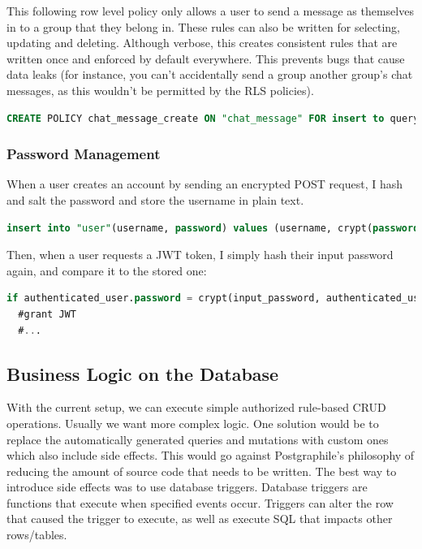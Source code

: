 \documentclass{l4proj}
\begin{document}
This following row level policy only allows a user to send a message as themselves in to a group that they belong in. These rules can also be written for selecting, updating and deleting. Although verbose, this creates consistent rules that are written once and enforced by default everywhere. This prevents bugs that cause data leaks (for instance, you can't accidentally send a group another group's chat messages, as this wouldn't be permitted by the RLS policies).

\begin{lstlisting}[language=SQL, caption={Row level security policy only allowing a user send messages as themselves to their team}, ]
CREATE POLICY chat_message_create ON "chat_message" FOR insert to query_sender with check (username = (select username from active_user()) and groupName = (select groupName from active_user()));
\end{lstlisting}

\subsubsection{Password Management}
When a user creates an account by sending an encrypted POST request, I hash and salt the password and store the username in plain text.

\begin{lstlisting}[language=SQL, caption={Hashing and salting done with pgcrypto}]
insert into "user"(username, password) values (username, crypt(password, gen_salt('bf')));
\end{lstlisting}

Then, when a user requests a JWT token, I simply hash their input password again, and compare it to the stored one:
\begin{lstlisting}[language=SQL, caption={Hashing and salting done with pgcrypto}]
if authenticated_user.password = crypt(input_password, authenticated_user.password) then
  #grant JWT
  #...
\end{lstlisting}

\subsection{Business Logic on the Database}
With the current setup, we can execute simple authorized rule-based CRUD operations. Usually we want more complex logic. One solution would be to replace the automatically generated queries and mutations with custom ones which also include side effects. This would go against Postgraphile's philosophy of reducing the amount of source code that needs to be written. The best way to introduce side effects was to use database triggers. Database triggers are functions that execute when specified events occur. Triggers can alter the row that caused the trigger to execute, as well as execute SQL that impacts other rows/tables.
\end{document}
